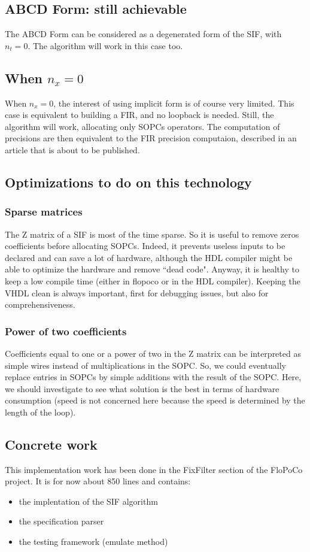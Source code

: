 	\subsection{ABCD Form: still achievable}
	The ABCD Form can be considered as a degenerated form of the SIF, with $n_t=0$.
	The algorithm will work in this case too.
	\subsection{When $n_x=0$}
	When $n_x=0$, the interest of using implicit form is of course very limited.
	This case is equivalent to building a FIR, and no loopback is needed.
	Still, the algorithm will work, allocating only SOPCs operators.
	The computation of precisions are then equivalent to the FIR precision computaion, described in an article that is about to be published.
	
\subsection{Optimizations to do on this technology}
	\subsubsection{Sparse matrices}
		The Z matrix of a SIF is most of the time sparse.
		So it is useful to remove zeros coefficients before allocating SOPCs.
		Indeed, it prevents useless inputs to be declared and can save a lot of hardware,
		although the HDL compiler might be able to optimize the hardware and remove ``dead code".
		Anyway, it is healthy to keep a low compile time (either in flopoco or in the HDL compiler).
		Keeping the VHDL clean is always important, first for debugging issues, but also for comprehensiveness.

	\subsubsection{Power of two coefficients}
		Coefficients equal to one or a power of two in the Z matrix can be interpreted as simple wires instead of multiplications in the SOPC.
		So, we could eventually replace entries in SOPCs by simple additions with the result of the SOPC.
		Here, we should investigate to see what solution is the best in terms of hardware consumption
		(speed is not concerned here because the speed is determined by the length of the loop).

	\subsection{Concrete work}
	This implementation work has been done in the FixFilter section of the FloPoCo project.
	It is for now about 850 lines and contains:
	\begin{itemize}
		\item the implentation of the SIF algorithm
		\item the specification parser
		\item the testing framework (emulate method)
	\end{itemize}

